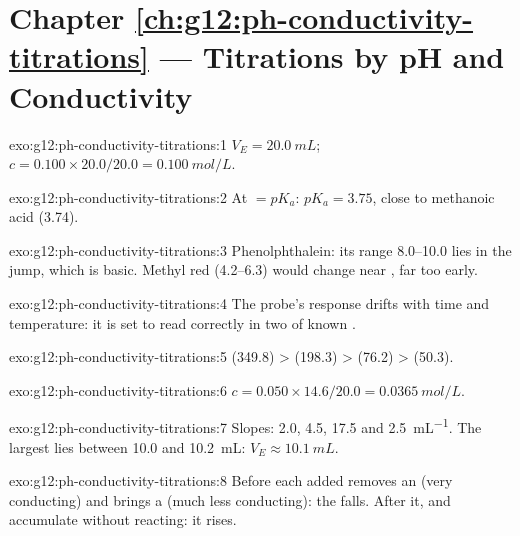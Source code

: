 \section*{Chapter \ref{ch:g12:ph-conductivity-titrations} --- Titrations by pH and Conductivity}

\begin{solution}{exo:g12:ph-conductivity-titrations:1}
$V_E = \qty{20.0}{mL}$; $c = 0.100 \times 20.0 / 20.0 = \qty{0.100}{mol/L}$.
\end{solution}

\begin{solution}{exo:g12:ph-conductivity-titrations:2}
At   $= pK_a$: $pK_a = 3.75$, close to methanoic acid
(3.74).
\end{solution}

\begin{solution}{exo:g12:ph-conductivity-titrations:3}
Phenolphthalein: its range 8.0--10.0 lies in the jump, which is basic.
Methyl red (4.2--6.3) would change near , far too early.
\end{solution}

\begin{solution}{exo:g12:ph-conductivity-titrations:4}
The probe's response drifts with time and temperature: it is set to read
correctly in two  of known .
\end{solution}

\begin{solution}{exo:g12:ph-conductivity-titrations:5}
 (349.8) >  (198.3) >  (76.2) >  (50.3).
\end{solution}

\begin{solution}{exo:g12:ph-conductivity-titrations:6}
$c = 0.050 \times 14.6 / 20.0 = \qty{0.0365}{mol/L}$.
\end{solution}

\begin{solution}{exo:g12:ph-conductivity-titrations:7}
Slopes: 2.0, 4.5, 17.5 and \qty{2.5}{mL^{-1}}. The largest lies between
10.0 and \qty{10.2}{mL}: $V_E \approx \qty{10.1}{mL}$.
\end{solution}

\begin{solution}{exo:g12:ph-conductivity-titrations:8}
Before  each  added removes an  (very
conducting) and brings a  (much less conducting): the
 falls. After it,  and  accumulate without
reacting: it rises.
\end{solution}

